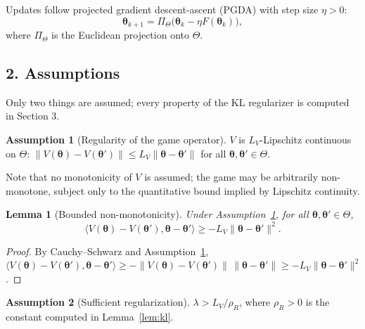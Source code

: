 \documentclass{article}
\newtheorem{lemma}[theorem]{Lemma}
\theoremstyle{definition}
\newtheorem{assumption}{Assumption}
\theoremstyle{remark}
\begin{document}
Updates follow projected gradient descent-ascent (PGDA) with step size $\eta > 0$:
\begin{equation}\label{eq:pgda}
\boldsymbol{\theta}_{k+1} = \Pi_\Theta \big( \boldsymbol{\theta}_k - \eta F(\boldsymbol{\theta}_k) \big),
\end{equation}
where $\Pi_\Theta$ is the Euclidean projection onto $\Theta$.

\subsection*{2. Assumptions}

Only two things are assumed; every property of the KL regularizer is computed in Section 3.

\begin{assumption}[Regularity of the game operator]\label{as:lip}
$V$ is $L_V$-Lipschitz continuous on $\Theta$:
$\|V(\boldsymbol{\theta}) - V(\boldsymbol{\theta}')\| \le L_V \|\boldsymbol{\theta} - \boldsymbol{\theta}'\|$
for all $\boldsymbol{\theta}, \boldsymbol{\theta}' \in \Theta$.
\end{assumption}

Note that no monotonicity of $V$ is assumed; the game may be arbitrarily non-monotone, subject only to the
quantitative bound implied by Lipschitz continuity.

\begin{lemma}[Bounded non-monotonicity]\label{lem:nonmono}
Under Assumption~\ref{as:lip}, for all $\boldsymbol{\theta}, \boldsymbol{\theta}' \in \Theta$,
\begin{equation}
\langle V(\boldsymbol{\theta}) - V(\boldsymbol{\theta}'), \boldsymbol{\theta} - \boldsymbol{\theta}' \rangle
\ge -L_V \|\boldsymbol{\theta} - \boldsymbol{\theta}'\|^2 .
\end{equation}
\end{lemma}

\begin{proof}
By Cauchy--Schwarz and Assumption~\ref{as:lip},
$\langle V(\boldsymbol{\theta}) - V(\boldsymbol{\theta}'), \boldsymbol{\theta} - \boldsymbol{\theta}' \rangle
\ge - \|V(\boldsymbol{\theta}) - V(\boldsymbol{\theta}')\| \, \|\boldsymbol{\theta} - \boldsymbol{\theta}'\|
\ge - L_V \|\boldsymbol{\theta} - \boldsymbol{\theta}'\|^2$.
\end{proof}

\begin{assumption}[Sufficient regularization]\label{as:lambda}
$\lambda > L_V / \rho_R$, where $\rho_R > 0$ is the constant computed in Lemma~\ref{lem:kl}.
\end{assumption}
\end{document}
